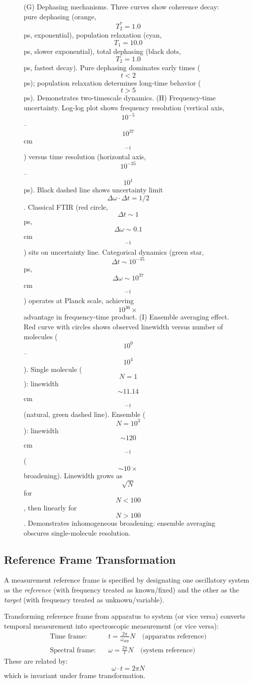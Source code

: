 \begin{figure}[htbp]
{    (G) Dephasing mechanisms. Three curves show coherence decay: pure dephasing (orange, $$T_2^* = 1.0$$ ps, exponential), population relaxation (cyan, $$T_1 = 10.0$$ ps, slower exponential), total dephasing (black dots, $$T_2 = 1.0$$ ps, fastest decay). Pure dephasing dominates early times ($$t < 2$$ ps); population relaxation determines long-time behavior ($$t > 5$$ ps). Demonstrates two-timescale dynamics. 
    (H) Frequency-time uncertainty. Log-log plot shows frequency resolution (vertical axis, $$10^{-5}$$--$$10^{37}$$ cm$$^{-1}$$) versus time resolution (horizontal axis, $$10^{-35}$$--$$10^1$$ ps). Black dashed line shows uncertainty limit $$\Delta\omega \cdot \Delta t = 1/2$$. Classical FTIR (red circle, $$\Delta t \sim 1$$ ps, $$\Delta\omega \sim 0.1$$ cm$$^{-1}$$) sits on uncertainty line. Categorical dynamics (green star, $$\Delta t \sim 10^{-35}$$ ps, $$\Delta\omega \sim 10^{37}$$ cm$$^{-1}$$) operates at Planck scale, achieving $$10^{36}\times$$ advantage in frequency-time product. 
    (I) Ensemble averaging effect. Red curve with circles shows observed linewidth versus number of molecules ($$10^0$$--$$10^4$$). Single molecule ($$N=1$$): linewidth $$\sim 11.14$$ cm$$^{-1}$$ (natural, green dashed line). Ensemble ($$N=10^3$$): linewidth $$\sim 120$$ cm$$^{-1}$$ ($$\sim 10\times$$ broadening). Linewidth grows as $$\sqrt{N}$$ for $$N < 100$$, then linearly for $$N > 100$$. Demonstrates inhomogeneous broadening: ensemble averaging obscures single-molecule resolution.}
    \label{fig:molecular_vibration_analysis}
    \end{figure}

\subsection{Reference Frame Transformation}

\begin{definition}
\label{def:measurement_frame}
A measurement reference frame is specified by designating one oscillatory system as the \textit{reference} (with frequency treated as known/fixed) and the other as the \textit{target} (with frequency treated as unknown/variable).
\end{definition}

\begin{proposition}
\label{prop:frame_transform}
Transforming reference frame from apparatus to system (or vice versa) converts temporal measurement into spectroscopic measurement (or vice versa):
\begin{align}
\text{Time frame:} \quad & t = \frac{2\pi}{\omega_{\text{app}}} N \quad \text{(apparatus reference)} \\
\text{Spectral frame:} \quad & \omega = \frac{2\pi}{t} N \quad \text{(system reference)}
\end{align}
These are related by:
\begin{equation}
\omega \cdot t = 2\pi N
\end{equation}
which is invariant under frame transformation.
\end{proposition}

